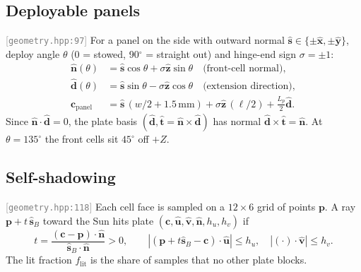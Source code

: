 \documentclass[11pt,a4paper]{article}
\newcommand{\vb}[1]{\boldsymbol{#1}}
\newcommand{\uv}[1]{\hat{\boldsymbol{#1}}}
\newcommand{\src}[1]{\textcolor{gray}{\small[\texttt{#1}]}}
\begin{document}
\subsection{Deployable panels} \src{geometry.hpp:97}
For a panel on the side with outward normal $\uv s\in\{\pm\uv x, \pm\uv y\}$, deploy angle $\theta$ (0 = stowed, 90$^\circ$ = straight out) and hinge-end sign $\sigma = \pm1$:
\begin{align}
\uv n(\theta) &= \uv s\cos\theta + \sigma\uv z\sin\theta \quad\text{(front-cell normal)},\\
\uv d(\theta) &= \uv s\sin\theta - \sigma\uv z\cos\theta \quad\text{(extension direction)},\\
\vb c_{\text{panel}} &= \uv s\,(w/2 + 1.5\,\mathrm{mm}) + \sigma\uv z\,(\ell/2) + \tfrac{L_p}{2}\uv d .
\end{align}
Since $\uv n\cdot\uv d = 0$, the plate basis $(\uv d, \uv t = \uv n\times\uv d)$ has normal $\uv d\times\uv t = \uv n$. At $\theta = 135^\circ$ the front cells sit $45^\circ$ off $+Z$.

\subsection{Self-shadowing} \src{geometry.hpp:118}
Each cell face is sampled on a $12\times6$ grid of points $\vb p$. A ray $\vb p + t\,\uv s_B$ toward the Sun hits plate $(\vb c, \uv u, \uv v, \uv n, h_u, h_v)$ if
\begin{equation}
t = \frac{(\vb c - \vb p)\cdot\uv n}{\uv s_B\cdot\uv n} > 0,\qquad
|(\vb p + t\uv s_B - \vb c)\cdot\uv u|\le h_u,\quad |(\cdot)\cdot\uv v|\le h_v .
\end{equation}
The lit fraction $f_{\text{lit}}$ is the share of samples that no other plate blocks.
\end{document}
